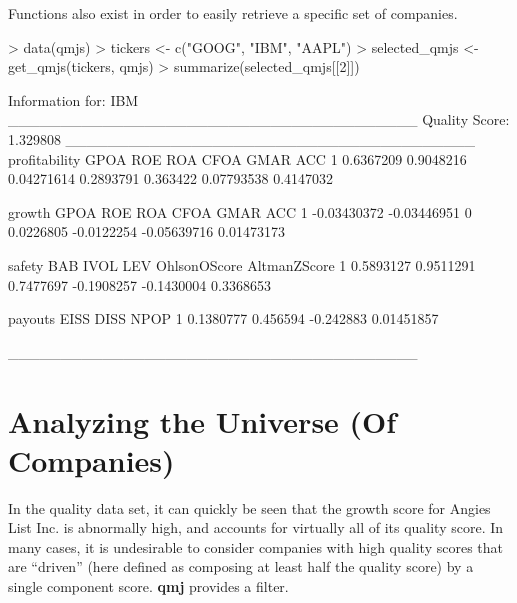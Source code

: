 \documentclass[titlepage]{article}
\begin{document}
Functions also exist in order to easily retrieve a specific set of companies.

\begin{Schunk}
\begin{Sinput}
> data(qmjs)
> tickers <- c("GOOG", "IBM", "AAPL")
> selected_qmjs <- get_qmjs(tickers, qmjs)
> summarize(selected_qmjs[[2]])
\end{Sinput}
\begin{Soutput}
Information for:  IBM
_______________________________________
Quality Score:  1.329808
_______________________________________
  profitability      GPOA        ROE       ROA     CFOA       GMAR       ACC
1     0.6367209 0.9048216 0.04271614 0.2893791 0.363422 0.07793538 0.4147032


       growth        GPOA ROE       ROA       CFOA        GMAR        ACC
1 -0.03430372 -0.03446951   0 0.0226805 -0.0122254 -0.05639716 0.01473173


     safety       BAB      IVOL        LEV OhlsonOScore AltmanZScore
1 0.5893127 0.9511291 0.7477697 -0.1908257   -0.1430004    0.3368653


    payouts     EISS      DISS       NPOP
1 0.1380777 0.456594 -0.242883 0.01451857

_______________________________________
\end{Soutput}
\end{Schunk}

\section*{Analyzing the Universe (Of Companies)}
In the quality data set, it can quickly be seen that the growth score for Angies List Inc. is abnormally high, and accounts for virtually all of its quality score. In many cases, it is undesirable to consider companies with high quality scores that are ``driven'' (here defined as composing at least half the quality score) by a single component score. \textbf{qmj} provides a filter.
\end{document}
